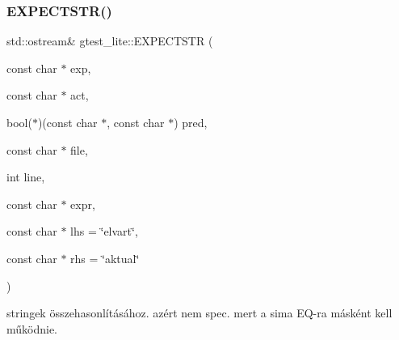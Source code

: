 \subsubsection{\texorpdfstring{E\+X\+P\+E\+C\+T\+S\+T\+R()}{EXPECTSTR()}}
{\footnotesize\ttfamily std\+::ostream\& gtest\+\_\+lite\+::\+E\+X\+P\+E\+C\+T\+S\+TR (\begin{DoxyParamCaption}\item[{const char $\ast$}]{exp,  }\item[{const char $\ast$}]{act,  }\item[{bool($\ast$)(const char $\ast$, const char $\ast$)}]{pred,  }\item[{const char $\ast$}]{file,  }\item[{int}]{line,  }\item[{const char $\ast$}]{expr,  }\item[{const char $\ast$}]{lhs = {\ttfamily \char`\"{}elvart\char`\"{}},  }\item[{const char $\ast$}]{rhs = {\ttfamily \char`\"{}aktual\char`\"{}} }\end{DoxyParamCaption})\hspace{0.3cm}{\ttfamily [inline]}}

stringek összehasonlításához. azért nem spec. mert a sima E\+Q-\/ra másként kell működnie. 